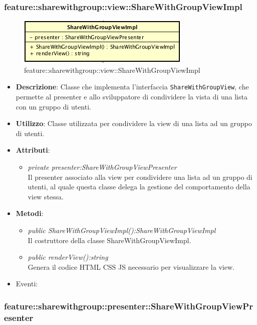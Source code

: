 \subsubsection{feature::sharewithgroup::view::ShareWithGroupViewImpl}

\label{feature::sharewithgroup::view::ShareWithGroupViewImpl}
\begin{figure}[H]
	\centering
	\includegraphics[scale=0.5]{Sezioni/SottosezioniST/img/app/ShareWithGroupViewImpl.png}
	\caption{feature::sharewithgroup::view::ShareWithGroupViewImpl}
\end{figure}

\begin{itemize}
\item \textbf{Descrizione}: Classe che implementa l'interfaccia \texttt{ShareWithGroupView}, che permette al presenter e allo sviluppatore di condividere la vista di una lista con un gruppo di utenti.
\item \textbf{Utilizzo}: Classe utilizzata per condividere la view di una lista ad un gruppo di utenti.
\item \textbf{Attributi}:
	\begin{itemize}
	\item \textit{private presenter:ShareWithGroupViewPresenter}\\
	Il presenter associato alla view per condividere una lista ad un gruppo di utenti, al quale questa classe delega la gestione del comportamento della view stessa.
	\end{itemize} 
\item \textbf{Metodi}:
	\begin{itemize}
	\item \textit{public ShareWithGroupViewImpl():ShareWithGroupViewImpl}\\
	Il costruttore della classe ShareWithGroupViewImpl.
	\item \textit{public renderView():string}\\
		Genera il codice HTML CSS JS necessario per visualizzare la view.
	\end{itemize}
\item{Eventi}:
\end{itemize}

\subsubsection{feature::sharewithgroup::presenter::ShareWithGroupViewPresenter}

